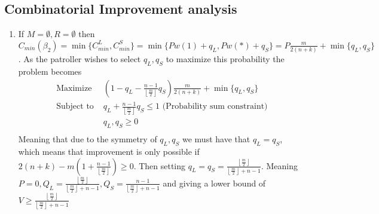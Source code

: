\documentclass[a4paper,10pt]{article}
\newcommand{\floor}[1]{\left \lfloor #1 \right \rfloor}
\theoremstyle{definition}
\theoremstyle{definition}
\theoremstyle{remark}
\theoremstyle{definition}
\begin{document}
\subsection{Combinatorial Improvement analysis}
\label{Appendix:Combinatorial analysis}
\begin{enumerate}
\item If $M= \emptyset , R= \emptyset$ then $C_{min} (\beta_{2})=\min \{ C_{min}^{L} , C_{min}^{S} \}= \min \{ Pw(1)+q_{L} , Pw(*)+q_{S} \}=P\frac{m}{2(n+k)} + \min \{ q_{L} , q_{S} \} $. As the patroller wishes to select $q_{L},q_{S}$ to maximize this probability the problem becomes
$$\begin{array}{cc}
\text{Maximize} &(1-q_{L}-\frac{n-1}{\floor{\frac{m}{2}}}q_{S}) \frac{m}{2(n+k)}+\min \{ q_{L}, q_{S}  \} \\
\text{Subject to } & q_{L}+\frac{n-1}{\floor{\frac{m}{2}}}q_{S} \leq 1 \text{  (Probability sum constraint)} \\
     & q_{L},q_{S} \geq 0 \\
\end{array} $$
Meaning that due to the symmetry of $q_{L},q_{S}$ we must have that $q_{L}=q_{S}$, which means that improvement is only possible if $2(n+k)- m(1+\frac{n-1}{\floor{\frac{m}{2}}}) \geq 0$. Then setting $q_{L}=q_{S}=\frac{\floor{\frac{m}{2}}}{\floor{\frac{m}{2}} +n-1}$. Meaning $P=0, Q_{L}=\frac{\floor{\frac{m}{2}}}{\floor{\frac{m}{2}} +n-1} , Q_{S}=\frac{n-1}{\floor{\frac{m}{2}} +n-1}$ and giving a lower bound of $V \geq \frac{\floor{\frac{m}{2}}}{\floor{\frac{m}{2}} +n-1}$


\end{enumerate}
\end{document}
